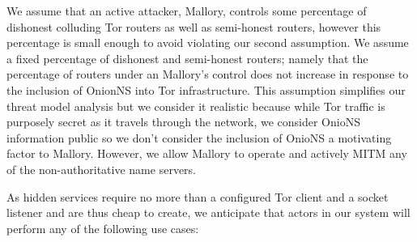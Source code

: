\documentclass[USenglish,oneside,twocolumn]{article}
\begin{document}
We assume that an active attacker, Mallory, controls some percentage of dishonest colluding Tor routers as well as semi-honest routers, however this percentage is small enough to avoid violating our second assumption. We assume a fixed percentage of dishonest and semi-honest routers; namely that the percentage of routers under an Mallory's control does not increase in response to the inclusion of OnionNS into Tor infrastructure. This assumption simplifies our threat model analysis but we consider it realistic because while Tor traffic is purposely secret as it travels through the network, we consider OnioNS information public so we don't consider the inclusion of OnioNS a motivating factor to Mallory. However, we allow Mallory to operate and actively MITM any of the non-authoritative name servers.





As hidden services require no more than a configured Tor client and a socket listener and are thus cheap to create, we anticipate that actors in our system will perform any of the following use cases:
\end{document}
